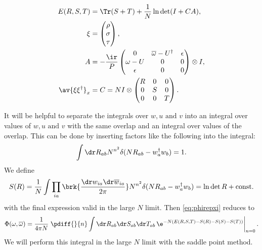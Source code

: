 \documentclass[12pt]{article}
\newcommand{\dg}{^\dagger}
\newcommand{\omb}{\overline{\omega}}
\newcommand{\dw}{\dr w}
\newcommand{\dwb}{\dr\overline{w}}
\begin{document}
\begin{equation}\label{eq:overlapenergy}
\begin{aligned}
  E(R,S,T) &= \Tr(S+T) + \frac{1}{N} \ln \det (I+CA),\\
  \xi &= \begin{pmatrix}
           \rho \\
           \sigma \\
           \tau \\
         \end{pmatrix},
 \\
  A &= -\frac{\ir}{P}
       \begin{pmatrix}
         0        & \omb-U\dg & \epsilon \\
         \omega-U & 0            & 0 \\
         \epsilon & 0            & 0 \\
       \end{pmatrix}\otimes I,\\
  \av{\xi\xi\dg}_x &=  C = N I\otimes
       \begin{pmatrix}
         R & 0 & 0 \\
         0 & S & 0 \\
         0 & 0 & T \\
       \end{pmatrix}.  \end{aligned}
\end{equation}
%

It will be helpful to separate the integrals over $w,u\text{ and }v$ into an integral over values of $w,u\text{ and }v$ with the same overlap and an integral over values of the overlap.
This can be done by inserting factors like the following into the integral:
%
\begin{equation}\label{eq:overlapdelta}
  \int \dr R_{ab} N^{n^2} \delta (N R_{ab} - w_a\dg w_b ) = 1.
\end{equation}
%
We define
%
\begin{equation}\label{eq:overlapentropy}
  S(R) = \frac{1}{N} \int \prod_{ia}\brk{ \frac{\dw_{ia}\dwb_{ia}}{2\pi} }
  N^{n^2} \delta (N R_{ab} - w_a\dg w_b )
   = \ln\det R + \text{const.}
\end{equation}
%
with the final expression valid in the large $N$ limit.
Then \eqref{eq:phirepxi} reduces to
%
\begin{equation}\label{eq:phioverlap}
  \Phi(\omega,\omb) = \frac{1}{4\pi N}  \left.\pdiff{}{n}
       \int \dr R_{ab} \dr S_{ab} \dr T_{ab}
       \,\e^{-N(E(R,S,T)-S(R)-S(S)-S(T))}
       \right\rvert_{n=0}.
\end{equation}
%
We will perform this integral in the large $N$ limit with the saddle point method.
\end{document}

